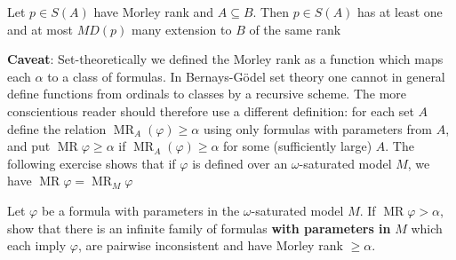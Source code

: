 \documentclass[11pt]{article}
\DeclareMathOperator{\MR}{MR}
\begin{document}
\begin{corollary}[]
Let \(p\in S(A)\) have Morley rank and \(A\subseteq B\). Then \(p\in S(A)\) has at least one and at
most \(MD(p)\) many extension to \(B\) of the same rank
\end{corollary}

\textbf{Caveat}: Set-theoretically we defined the Morley rank as a function which maps each \(\alpha\) to a class
of formulas. In Bernays-Gödel set theory one cannot in general define functions from ordinals to
classes by a recursive scheme. The more conscientious reader should therefore use a different
definition: for each set \(A\) define the relation \(\MR_A(\varphi)\ge\alpha\) using only formulas with
parameters from \(A\), and put \(\MR\varphi\ge\alpha\) if \(\MR_A(\varphi)\ge\alpha\) for some (sufficiently large) \(A\).
The following exercise shows that if \(\varphi\) is defined over an \(\omega\)-saturated model \(M\), we
have \(\MR\varphi=\MR_M\varphi\)

\begin{exercise}
\label{ex6.2.1}
Let \(\varphi\) be a formula with parameters in the \(\omega\)-saturated model \(M\). If \(\MR\varphi>\alpha\), show that
there is an infinite family of formulas \textbf{with parameters in} \(M\) which each imply \(\varphi\), are
pairwise inconsistent and have Morley rank \(\ge\alpha\).
\end{exercise}
\end{document}
